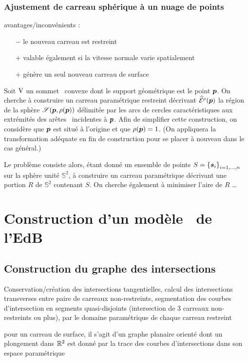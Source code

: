\subsubsection{Ajustement de carreau sphérique à un nuage de points}
\label{section:ajustement_carreau_spherique}

\def\s{\vit{s}}

avantages/inconvénients :
\begin{itemize}
	\item[$-$] le nouveau carreau est restreint
	\item[$+$] valable également si la vitesse normale varie spatialement
	\item[$+$] génère un seul nouveau carreau de surface
\end{itemize}

Soit $\mathrm{V}$ un sommet \brep\ convexe dont le support géométrique est le point $\bm{p}$. 
On cherche à construire un carreau paramétrique restreint décrivant $\widehat{\mathcal{E}}^{\rho}({\bm{p}})$ \ie la région de la sphère $\sphere[\p][\rho(\p)]$ délimitée par les arcs de cercles caractéristiques aux extrémités des arêtes \brep\ incidentes à $\bm{p}$. 
Afin de simplifier cette construction, on considère que $\bm{p}$ est situé à l'origine et que $\rho(\bm{p}) = 1$. 
(On appliquera la transformation adéquate en fin de construction pour se placer à nouveau dans le cas général.)
\par
Le problème consiste alors, étant donné un ensemble de points $S = \family{\s}{i}{1}{n}$ sur la sphère unité $\mathbb{S}^2$, à construire un carreau paramétrique décrivant une portion $R$ de $\mathbb{S}^2$ contenant $S$. 
On cherche également à minimiser l'aire de $R$ \ldots




\section{Construction d'un modèle \brep\ de l'EdB}

\subsection{Construction du graphe des intersections}
Conservation/création des intersections tangentielles, calcul des intersections transverses entre paire de carreaux non-restreints, segmentation des courbes d'intersection en segments quasi-disjoints (intersection de 3 carreaux non-restreints ou plus),  par le domaine paramétrique de chaque carreau restreint
\par\bigskip
pour un carreau de surface, il s'agit d'un graphe planaire orienté dont un plongement dans $\mathbb{R}^2$ est donné par la trace des courbes d'intersections dans son espace paramétrique

